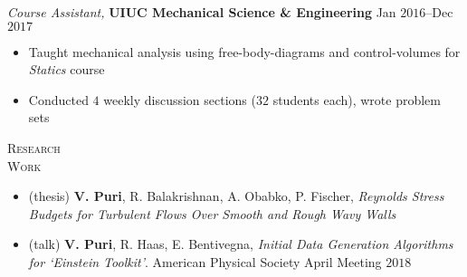 \documentclass[10pt]{article}
\begin{document}
\begin{multicols}{2}
\vspace{0.5em}
%
{\sl Course Assistant,} \textbf{UIUC Mechanical Science \& Engineering} \hfill Jan $2016$--Dec $2017$

\vspace{-1.75em}
\begin{itemize}[label=-]
    \setlength\itemsep{-0.25em}
    \item Taught mechanical analysis using free-body-diagrams and control-volumes for \textit{Statics} course
    \item Conducted $4$ weekly discussion sections ($32$ students each), wrote problem sets
\end{itemize}
\vspace{-2.0em}

\end{multicols}
\vspace{-1.5em}
\begin{multicols}{2}
\textsc{\small Research \\ Work}
\columnbreak

\vspace{-1.75em}
\begin{itemize}[label= ]
    \setlength{\itemindent}{-2.5em}
    \setlength\itemsep{-1.0\itemsep}
    \item (thesis) \textbf{V. Puri}, R. Balakrishnan, A. Obabko, P. Fischer, {\sl Reynolds Stress Budgets for Turbulent Flows Over Smooth and Rough Wavy Walls}
    \item (talk) \textbf{V. Puri}, R. Haas, E. Bentivegna, {\sl Initial Data Generation Algorithms for `Einstein Toolkit'}. American Physical Society April Meeting $2018$
\end{itemize}
\vspace{-2.0em}

\end{multicols}
\vspace{-1.5em}
\end{document}
